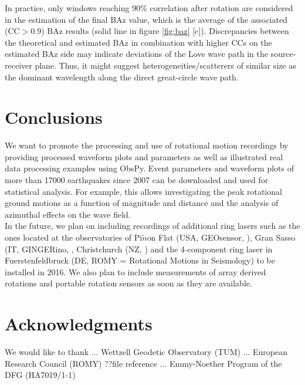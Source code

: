 \documentclass[12pt,reqno,letter]{article} %
\begin{document}
In practice, only windows reaching 90\% correlation after rotation are considered in the estimation of the final BAz value, which is the average of the associated (CC$>$0.9) BAz results (solid line in figure \ref{fig:baz} [c]). 
Discrepancies between the theoretical and estimated BAz in combination with higher CCs on the estimated BAz side may indicate deviations of the Love wave path in the source-receiver plane. Thus, it might suggest heterogeneities/scatterers of similar size as the dominant wavelength along the direct great-circle wave path.\\

\section{Conclusions}
We want to promote the processing and use of rotational motion recordings by providing processed waveform plots and parameters as well as illustrated real data processing examples using ObsPy. Event parameters and waveform plots of more than 17000 earthquakes since 2007 can be downloaded and used for statistical analysis. For example, this allows investigating the peak rotational ground motions as a function of magnitude and distance and the analysis of azimuthal effects on the wave field.\\
In the future, we plan on including recordings of additional ring lasers such as the ones located at the observatories of Pi$\tilde{n}$on Flat (USA, GEOsensor, \cite{Schreiber2003b}), Gran Sasso (IT, GINGERino, \cite{Ortolan2016}, Christchurch (NZ, \cite{Schreiber2003}) and the 4-component ring laser in Fuerstenfeldbruck (DE, ROMY = Rotational Motions in Seismology) to be installed in 2016. We also plan to include measurements of array derived rotations and portable rotation sensors as soon as they are available.



\section*{Acknowledgments}
We would like to thank ... Wettzell Geodetic Observatory (TUM) ... European Research Council (ROMY) ??file reference ... Emmy-Noether Program of the
DFG (HA7019/1-1)



\label{Bibliography}

%
%
\end{document}

